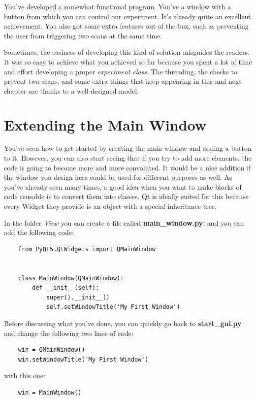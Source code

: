 You've developed a somewhat functional program. You've a window with a button from which you can control our experiment. It's already quite an excellent achievement. You also got some extra features out of the box, such as preventing the user from triggering two scans at the same time.

Sometimes, the easiness of developing this kind of solution misguides the readers. It was so easy to achieve what you achieved so far because you spent a lot of time and effort developing a proper \emph{experiment class}. The threading, the checks to prevent two scans, and some extra things that keep appearing in this and next chapter are thanks to a well-designed model.


\section{Extending the Main Window}\label{sec:extending-main-window}
You've seen how to get started by creating the main window and adding a button to it. However, you can also start seeing that if you try to add more elements, the code is going to become more and more convoluted. It would be a nice addition if the window you design here could be used for different purposes as well. As you've already seen many times, a good idea when you want to make blocks of code reusable is to convert them into classes. Qt is ideally suited for this because every Widget they provide is an object with a special inheritance tree.

In the folder \emph{View} you can create a file called \textbf{main\_window.py}, and you can add the following code:

\begin{verbatim}
    from PyQt5.QtWidgets import QMainWindow


    class MainWindow(QMainWindow):
        def __init__(self):
            super().__init__()
            self.setWindowTitle('My First Window')
\end{verbatim}

Before discussing what you've done, you can quickly go back to \textbf{start\_gui.py} and change the following two lines of code:

\begin{verbatim}
    win = QMainWindow()
    win.setWindowTitle('My First Window')
\end{verbatim}

with this one:

\begin{verbatim}
    win = MainWindow()
\end{verbatim}

